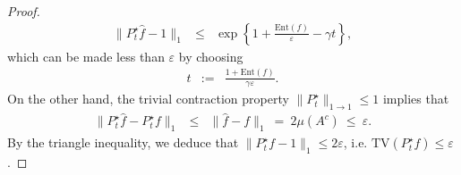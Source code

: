 \documentclass[12pt,final]{article}
\numberwithin{equation}{section}
\newcommand{\TV}{\mathrm {TV}}
\newcommand{\Ent}{\mathrm{Ent}}
\begin{document}
\begin{proof}
\begin{eqnarray*}
\|P_t^\star \widehat{f}-1\|_1  & \le & \exp\left\{1+\frac{\Ent(f)}{\varepsilon}-\gamma t\right\},
 \end{eqnarray*}
which can be made less than $\varepsilon$ by choosing
\begin{eqnarray*}
\label{def:t}
t & := & \frac{1+\Ent(f)}{\gamma\varepsilon}.
\end{eqnarray*}
On the other hand, the trivial contraction property $\|P_t^\star\|_{1\to 1}\le 1$ implies that
\begin{eqnarray*}
\|P_t^\star \widehat{f} - P_t^\star f\|_1 & \le & \|\widehat{f}-f\|_{1}  \ = \ 2\mu(A^c) \ \le \ \varepsilon.
\end{eqnarray*}
By the triangle inequality, we deduce that $\|P_t^\star f-1\|_{1}  \le  2\varepsilon$, i.e. $\TV(P_t^\star f)\le \varepsilon$. 
\end{proof}
\end{document}
